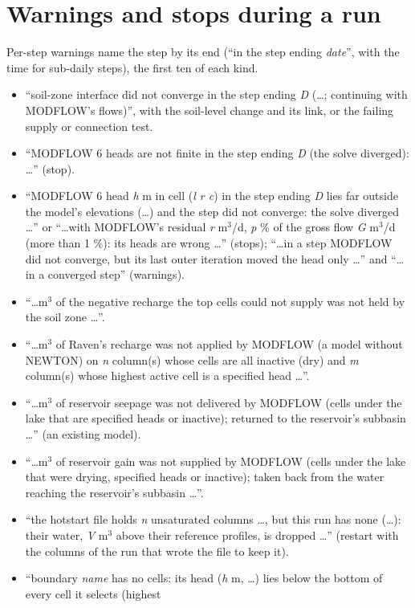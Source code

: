 \section{Warnings and stops during a run}\label{app:warnings}
Per-step warnings name the step by its end (``in the step ending \emph{date}'', with the time for
sub-daily steps), the first ten of each kind.
\begin{itemize}
\item ``soil-zone interface did not converge in the step ending \emph{D} (\ldots; continuing with MODFLOW's flows)'', with the
soil-level change and its link, or the failing supply or connection test.
\item ``MODFLOW 6 heads are not finite in the step ending \emph{D} (the solve diverged): \ldots'' (stop).
\item ``MODFLOW 6 head \emph{h} m in cell (\emph{l r c}) in the step ending \emph{D} lies far outside the model's elevations
(\ldots) and the step did not converge: the solve diverged \ldots'' or ``\ldots with MODFLOW's residual \emph{r} m$^3$/d,
\emph{p} \% of the gross flow \emph{G} m$^3$/d (more than 1 \%): its heads are wrong \ldots'' (stops); ``\ldots in a step
MODFLOW did not converge, but its last outer iteration moved the head only \ldots'' and ``\ldots in a converged step'' (warnings).
\item ``\ldots m$^3$ of the negative recharge the top cells could not supply was not held by the soil zone \ldots''.
\item ``\ldots m$^3$ of Raven's recharge was not applied by MODFLOW (a model without NEWTON) on \emph{n} column(s) whose cells are
all inactive (dry) and \emph{m} column(s) whose highest active cell is a specified head \ldots''.
\item ``\ldots m$^3$ of reservoir seepage was not delivered by MODFLOW (cells under the lake that are specified heads or
inactive); returned to the reservoir's subbasin \ldots'' (an existing model).
\item ``\ldots m$^3$ of reservoir gain was not supplied by MODFLOW (cells under the lake that were drying, specified heads or
inactive); taken back from the water reaching the reservoir's subbasin \ldots''.
\item ``the hotstart file holds \emph{n} unsaturated columns \ldots, but this run has none (\ldots): their water, \emph{V} m$^3$
above their reference profiles, is dropped \ldots'' (restart with the columns of the run that wrote the file to keep it).
\item ``boundary \emph{name} has no cells: its head (\emph{h} m, \ldots) lies below the bottom of every cell it selects (highest

\end{itemize}
